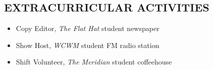 \documentclass{res}
\begin{document}
\begin{resume}
\section{EXTRACURRICULAR ACTIVITIES}          
\vspace{6mm}
\begin{itemize}[leftmargin=5mm]
    \item Copy Editor, \emph{The Flat Hat} student newspaper
    \item Show Host, \emph{WCWM} student FM radio station
    \item Shift Volunteer, \emph{The Meridian} student coffeehouse
\end{itemize}
 
\end{resume}
\end{document}
